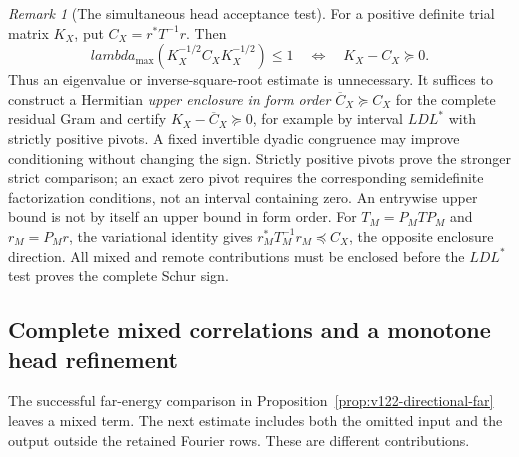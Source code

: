 \documentclass[11pt]{article}
\def\lambda{lambda}%
\theoremstyle{remark}
\newtheorem{remark}[theorem]{Remark}
\begin{document}
\begin{remark}[The simultaneous head acceptance test]
\label{rem:v122-head-ldl}
For a positive definite trial matrix $K_X$, put
$C_X=r^*T^{-1}r$. Then
\[
 \lambda_{\max}(K_X^{-1/2}C_XK_X^{-1/2})\le1
 \quad\Longleftrightarrow\quad K_X-C_X\succeq0.
\]
Thus an eigenvalue or inverse-square-root estimate is unnecessary.
It suffices to construct a Hermitian \emph{upper enclosure in form
order} $\overline C_X\succeq C_X$ for the complete residual Gram
and certify $K_X-\overline C_X\succeq0$, for example by interval
$LDL^*$ with strictly positive pivots. A fixed invertible dyadic
congruence may improve conditioning without changing the sign.
Strictly positive pivots prove the stronger strict comparison;
an exact zero pivot requires the corresponding semidefinite
factorization conditions, not an interval containing zero.
An entrywise upper bound is not by itself an upper bound in form
order. For $T_M=P_MT P_M$ and $r_M=P_Mr$, the variational identity
gives $r_M^*T_M^{-1}r_M\preceq C_X$, the opposite enclosure
direction. All mixed and remote contributions must be enclosed
before the $LDL^*$ test proves the complete Schur sign.
\end{remark}

\subsection{Complete mixed correlations and a monotone head refinement}

The successful far-energy comparison in
Proposition~\ref{prop:v122-directional-far} leaves a mixed term.
The next estimate includes both the omitted input and the output
outside the retained Fourier rows. These are different contributions.
\end{document}
